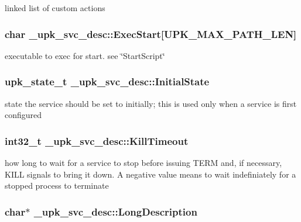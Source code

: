 linked list of custom actions 
\subsubsection{\setlength{\rightskip}{0pt plus 5cm}char \bf{\_\-upk\_\-svc\_\-desc::Exec\-Start}[UPK\_\-MAX\_\-PATH\_\-LEN]\hspace{0.3cm}{\tt  [inherited]}}\label{group__config__impl_g374c9f651069bd10382991eac40d1ddd}


executable to exec for start. see \char`\"{}Start\-Script\char`\"{} 
\subsubsection{\setlength{\rightskip}{0pt plus 5cm}\bf{upk\_\-state\_\-t} \bf{\_\-upk\_\-svc\_\-desc::Initial\-State}\hspace{0.3cm}{\tt  [inherited]}}\label{group__config__impl_g972b247d009f552fb2777d71294d4df5}


state the service should be set to initially; this is used only when a service is first configured 
\subsubsection{\setlength{\rightskip}{0pt plus 5cm}int32\_\-t \bf{\_\-upk\_\-svc\_\-desc::Kill\-Timeout}\hspace{0.3cm}{\tt  [inherited]}}\label{group__config__impl_ga7a67d13b8ede2f259c3e4bb987c5c3a}


how long to wait for a service to stop before issuing TERM and, if necessary, KILL signals to bring it down. A negative value means to wait indefiniately for a stopped process to terminate 
\subsubsection{\setlength{\rightskip}{0pt plus 5cm}char$\ast$ \bf{\_\-upk\_\-svc\_\-desc::Long\-Description}\hspace{0.3cm}{\tt  [inherited]}}\label{group__config__impl_g6a136a4ee6b41048119f8e3785260fef}


